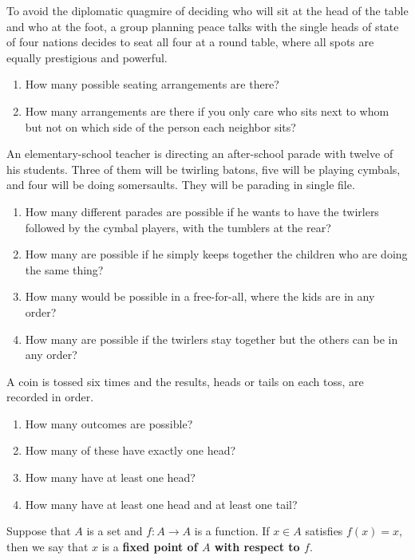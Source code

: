 \begin{prb}
To avoid the diplomatic quagmire of deciding who will sit at the head of the table and who at the foot, a group planning peace talks with the single heads of state of four nations decides to seat all four at a round table, where all spots are equally prestigious and powerful.
\begin{enumerate}
\item  How many possible seating arrangements are there?
\item  How many arrangements are there if you only care who sits next to whom but not on which side of the person each neighbor sits?
\end{enumerate}
\end{prb}

\begin{prb}
An elementary-school teacher is directing an after-school parade with twelve of his students. Three of them will be twirling batons, five will be playing cymbals, and four will be doing somersaults. They will be parading in single file.
\begin{enumerate}
\item  How many different parades are possible if he wants to have the twirlers followed by the cymbal players, with the tumblers at the rear?
\item  How many are possible if he simply keeps together the children who are doing the same thing?
\item  How many would be possible in a free-for-all, where the kids are in any order?
\item  How many are possible if the twirlers stay together but the others can be in any order?
\end{enumerate}
\end{prb}

\begin{prb}
A coin is tossed six times and the results, heads or tails on each toss, are  recorded in order.
\begin{enumerate}
\item  How many outcomes are possible?
\item  How many of these have exactly one head?
\item  How many have at least one head?
\item  How many have at least one head and at least one tail?
\end{enumerate}
\end{prb}

\begin{dfn}
Suppose that $A$ is a set and $f: A \to A$ is a function.   If $x\in A$ satisfies $f(x)=x$, then we say that $x$ is a \textbf{fixed point of $A$ with respect to $f$}.
\end{dfn}

